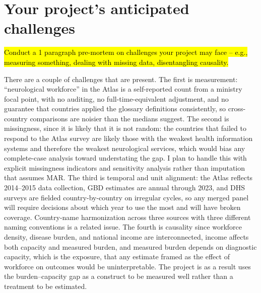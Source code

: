\documentclass[12pt]{article}
\begin{document}
\section{Your project's anticipated challenges}

\hl{Conduct a 1 paragraph pre-mortem on challenges your project may face -- e.g., measuring something, dealing with missing data, disentangling causality.}

There are a couple of challenges that are present. The first is measurement: ``neurological
workforce'' in the Atlas is a self-reported count from a ministry focal point,
with no auditing, no full-time-equivalent adjustment, and no guarantee that
countries applied the glossary definitions consistently, so cross-country
comparisons are noisier than the medians suggest. The second is
missingness, since it is likely that it is not random: the countries that
failed to respond to the Atlas survey are likely those with the weakest health
information systems and therefore the weakest neurological services, which would
bias any complete-case analysis toward understating the gap. I plan to handle
this with explicit missingness indicators and sensitivity analysis rather than
imputation that assumes MAR. The third is temporal and unit alignment: the Atlas
reflects 2014--2015 data collection, GBD estimates are annual through 2023, and
DHS surveys are fielded country-by-country on irregular cycles, so any merged
panel will require decisions about which year to use the most and will
have broken coverage. Country-name harmonization across three sources with three
different naming conventions is a related issue. The fourth is
causality since workforce density,
disease burden, and national income are interconnected, income affects
both capacity and measured burden, and measured burden depends on diagnostic
capacity, which is the exposure, that any estimate framed as the effect of
workforce on outcomes would be uninterpretable. The project is as a result uses the burden--capacity gap as a construct to be
measured well rather than a treatment to be estimated.
\end{document}
